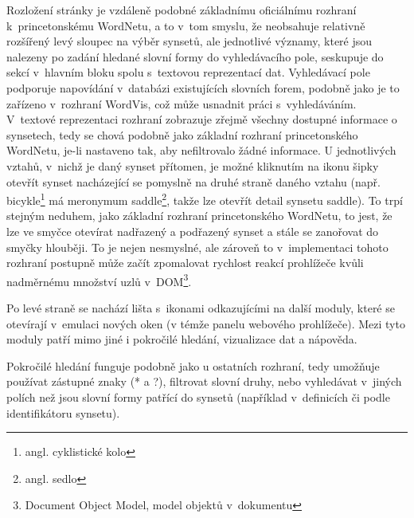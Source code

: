 \documentclass[a4paper, 11pt, oneside, showtrims]{book}
\newcommand\ex{\textsf}
\begin{document}
					Rozložení stránky je vzdáleně podobné základnímu oficiálnímu rozhraní k~princetonskému WordNetu, a to v~tom smyslu, že neobsahuje relativně rozšířený levý sloupec na výběr synsetů, ale jednotlivé významy, které jsou nalezeny po zadání hledané slovní formy do vyhledávacího pole, seskupuje do sekcí v~hlavním bloku spolu s~textovou reprezentací dat. Vyhledávací pole podporuje napovídání v~databázi existujících slovních forem, podobně jako je to zařízeno v~rozhraní WordVis, což může usnadnit práci s~vyhledáváním. V~textové reprezentaci rozhraní zobrazuje zřejmě všechny dostupné informace o synsetech, tedy se chová podobně jako základní rozhraní princetonského WordNetu, je-li nastaveno tak, aby nefiltrovalo žádné informace. U jednotlivých vztahů, v~nichž je daný synset přítomen, je možné kliknutím na ikonu šipky otevřít synset nacházející se pomyslně na druhé straně daného vztahu (např. \ex{bicykle}\footnote{angl. \ex{cyklistické kolo}} má meronymum \ex{saddle}\footnote{angl. \ex{sedlo}}, takže lze otevřít detail synsetu \ex{saddle}). To trpí stejným neduhem, jako základní rozhraní princetonského WordNetu, to jest, že lze ve smyčce otevírat nadřazený a podřazený synset a stále se zanořovat do smyčky hlouběji. To je nejen nesmyslné, ale zároveň to v~implementaci tohoto rozhraní postupně může začít zpomalovat rychlost reakcí prohlížeče kvůli nadměrnému množství uzlů v~DOM\footnote{Document Object Model, model objektů v~dokumentu}.

					Po levé straně se nachází lišta s~ikonami odkazujícími na další moduly, které se otevírají v~emulaci nových oken (v témže panelu webového prohlížeče). Mezi tyto moduly patří mimo jiné i pokročilé hledání, vizualizace dat a nápověda. 

					Pokročilé hledání funguje podobně jako u ostatních rozhraní, tedy umožňuje používat zástupné znaky (\ex{*} a \ex{?}), filtrovat slovní druhy, nebo vyhledávat v~jiných polích než jsou slovní formy patřící do synsetů (například v~definicích či podle identifikátoru synsetu). 
\end{document}
